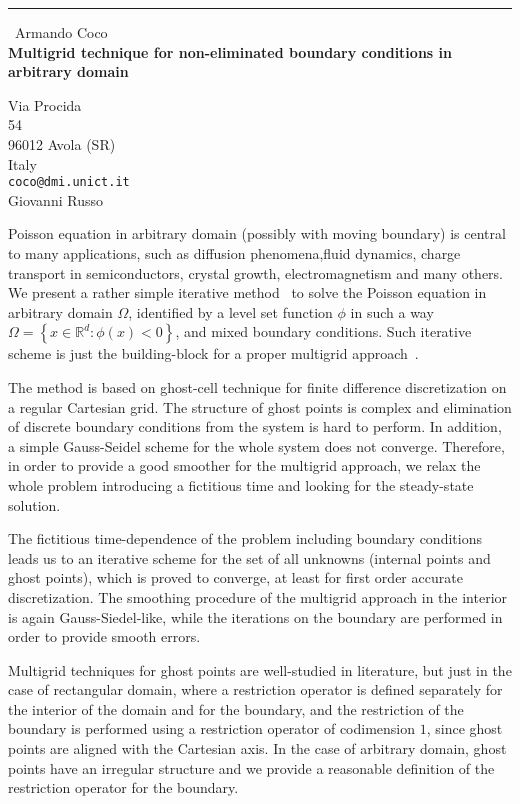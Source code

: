 \documentclass{report}
\begin{document}
\begin{center}
\rule{6in}{1pt} \
{\large Armando Coco \\
{\bf Multigrid technique for non-eliminated boundary conditions in arbitrary domain}}

Via Procida \\ 54 \\ 96012 Avola (SR) \\ Italy
\\
{\tt coco@dmi.unict.it}\\
Giovanni Russo\end{center}

Poisson equation in arbitrary domain (possibly with moving boundary) is
central to many applications, such as diffusion phenomena,fluid dynamics,
charge transport in semiconductors, crystal growth, electromagnetism and
many others.
We present a rather simple iterative method~\cite{CocoRusso:Elliptic} to
solve the Poisson equation in arbitrary domain $\Omega$, identified by a
level set function $\phi$ in such a way $\Omega=\left\{ x \in
\mathbb{R}^d \colon \phi(x)<0 \right\}$, and mixed boundary conditions.
Such iterative scheme is just the building-block for a proper multigrid
approach~\cite{CocoRusso:MG}.

The method is based on ghost-cell technique for finite difference
discretization on a regular Cartesian grid. The structure of ghost points
is complex and elimination of discrete boundary conditions from the
system is hard to perform. In addition, a simple Gauss-Seidel scheme for
the whole system does not converge. Therefore, in order to provide a good
smoother for the multigrid approach, we relax the whole problem
introducing a fictitious time and looking for the steady-state solution.

The fictitious time-dependence of the problem including boundary
conditions leads us to an iterative scheme for the set of all unknowns
(internal points and ghost points), which is proved to converge, at least
for first order accurate discretization. The smoothing procedure of the
multigrid approach in the interior is again Gauss-Siedel-like, while the
iterations on the boundary are performed in order to provide smooth
errors.

Multigrid techniques for ghost points are well-studied in literature, but
just in the case of rectangular domain, where a restriction operator is
defined separately for the interior of the domain and for the boundary,
and the restriction of the boundary is performed using a restriction
operator of codimension $1$, since ghost points are aligned with the
Cartesian axis.
In the case of arbitrary domain, ghost points have an irregular structure
and we provide a reasonable definition of the restriction operator for
the boundary.
\end{document}
